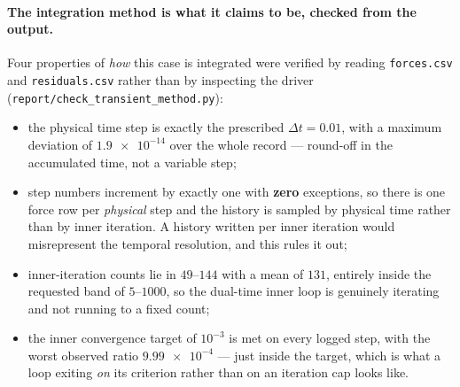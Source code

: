 \paragraph{The integration method is what it claims to be, checked from the output.} Four
properties of \emph{how} this case is integrated were verified by reading
\texttt{forces.csv} and \texttt{residuals.csv} rather than by inspecting the driver
(\texttt{report/check\_transient\_method.py}):
\begin{itemize}
  \item the physical time step is exactly the prescribed $\Delta t=0.01$, with a maximum
  deviation of $\num{1.9e-14}$ over the whole record --- round-off in the accumulated time,
  not a variable step;
  \item step numbers increment by exactly one with \textbf{zero} exceptions, so there is one
  force row per \emph{physical} step and the history is sampled by physical time rather than
  by inner iteration. A history written per inner iteration would misrepresent the temporal
  resolution, and this rules it out;
  \item inner-iteration counts lie in $49$--$144$ with a mean of $131$, entirely inside the
  requested band of $5$--$1000$, so the dual-time inner loop is genuinely iterating and not
  running to a fixed count;
  \item the inner convergence target of $10^{-3}$ is met on every logged step, with the
  worst observed ratio $\num{9.99e-4}$ --- just inside the target, which is what a loop
  exiting \emph{on} its criterion rather than on an iteration cap looks like.
\end{itemize}

